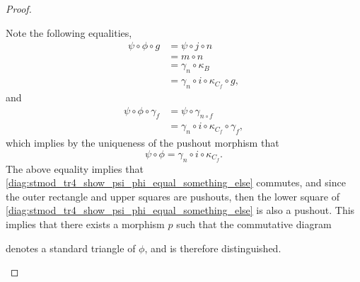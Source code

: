 \begin{proof}
\begin{enumerate}[label={(\bfseries TR\arabic*)}]
{            Note the following equalities,
            \begin{align*}
                \psi \circ \phi \circ g &= \psi \circ j \circ n \\
                &= m \circ n \\
                &= \gamma_n \circ \kappa_B \\
                &= \gamma_n \circ i \circ \kappa_{C_f} \circ g,
            \end{align*}
            and
            \begin{align*}
                \psi \circ \phi \circ \gamma_f &= \psi \circ \gamma_{n \circ f} \\
                &= \gamma_n \circ i \circ \kappa_{C_f} \circ \gamma_f,
            \end{align*}
            which implies by the uniqueness of the pushout morphism that
            \[
                \psi \circ \phi = \gamma_n \circ i \circ \kappa_{C_f}.
            \]
            The above equality implies that \autoref{diag:stmod_tr4_show_psi_phi_equal_something_else} commutes, and since the outer rectangle and upper squares are pushouts, then the lower square of \autoref{diag:stmod_tr4_show_psi_phi_equal_something_else} is also a pushout. This implies that there exists a morphism \( p \) such that the commutative diagram
            \begin{center}
            \end{center}
            denotes a standard triangle of \( \phi \), and is therefore distinguished.

            
}
\end{enumerate}
\end{proof}
